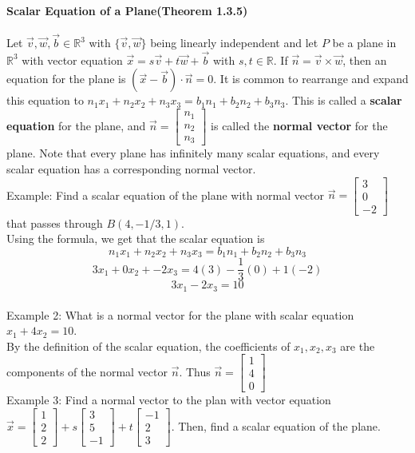 \documentclass[10pt,letter]{article}
\begin{document}
\paragraph{Scalar Equation of a Plane(Theorem 1.3.5)}Let $\vec{v},\vec{w},\vec{b}\in\mathbb{R}^3$ with $\{\vec{v},\vec{w}\}$ being linearly independent and let $P$ be a plane in $\mathbb{R}^3$ with vector equation $\vec{x}=s\vec{v}+t\vec{w}+\vec{b}$ with $s,t\in\mathbb{R}$. If $\vec{n}=\vec{v}\times\vec{w}$, then an equation for the plane is $(\vec{x}-\vec{b})\cdot\vec{n}=0$. It is common to rearrange and expand this equation to $n_1x_1+n_2x_2+n_3x_3=b_1n_1+b_2n_2+b_3n_3$. This is called a \textbf{scalar equation} for the plane, and $\vec{n}=\begin{bmatrix}n_1\\n_2\\n_3\end{bmatrix}$ is called the \textbf{normal vector} for the plane. Note that every plane has infinitely many scalar equations, and every scalar equation has a corresponding normal vector. \\ 
Example: Find a scalar equation of the plane with normal vector $\vec{n}=\begin{bmatrix}3\\0\\-2\end{bmatrix}$ that passes through $B(4,-1/3,1)$. \\ 
Using the formula, we get that the scalar equation is $$n_1x_1+n_2x_2+n_3x_3=b_1n_1+b_2n_2+b_3n_3$$ $$3x_1+0x_2+-2x_3=4(3)-\frac{1}{3}(0)+1(-2)$$ $$3x_1-2x_3=10$$ \\
Example 2: What is a normal vector for the plane with scalar equation $x_1+4x_2=10$.\\ 
By the definition of the scalar equation, the coefficients of $x_1,x_2,x_3$ are the components of the normal vector $\vec{n}$. Thus $\vec{n}=\begin{bmatrix}1\\4\\0\end{bmatrix}$ \\ 
Example 3: Find a normal vector to the plan with vector equation $\vec{x}=\begin{bmatrix}1\\2\\2\end{bmatrix}+s\begin{bmatrix}3\\5\\-1\end{bmatrix}+t\begin{bmatrix}-1\\2\\3\end{bmatrix}$. Then, find a scalar equation of the plane. \\ 
\end{document}
